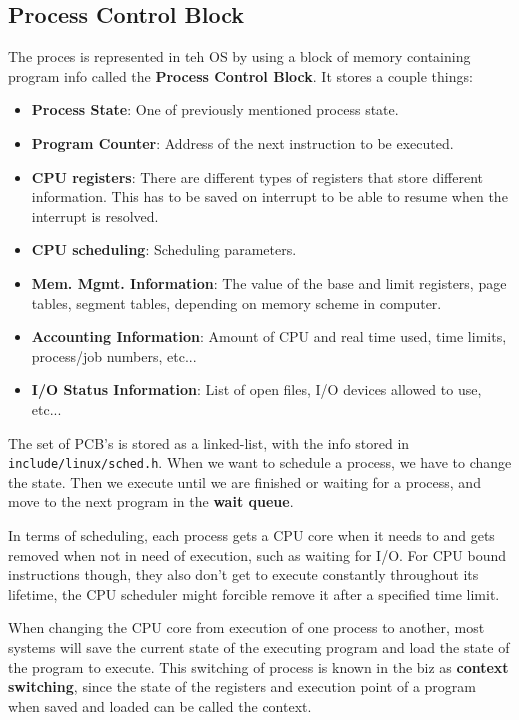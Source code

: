 \documentclass{tufte-handout}
\begin{document}
\subsection{Process Control Block}
The proces is represented in teh OS by using a block of memory containing program info called
the \textbf{Process Control Block}. It stores a couple things:
\begin{itemize}
	\item \textbf{Process State}: One of previously mentioned process state.
	\item \textbf{Program Counter}: Address of the next instruction to be executed.
	\item \textbf{CPU registers}: There are different types of registers that store different
				information. This has to be saved on interrupt to be able to resume when the 
				interrupt is resolved.
	\item \textbf{CPU scheduling}: Scheduling parameters.
	\item \textbf{Mem. Mgmt. Information}: The value of the base and limit registers, page tables, 
				segment tables, depending on memory scheme in computer.
	\item \textbf{Accounting Information}: Amount of CPU and real time used, time limits, 
				process/job numbers, etc...
	\item \textbf{I/O Status Information}: List of open files, I/O devices allowed to use, etc...
\end{itemize}

The set of PCB's is stored as a linked-list, with the info stored in \texttt{include/linux/sched.h}.
When we want to schedule a process, we have to change the state. Then we execute until we are
finished or waiting for a process, and move to the next program in the \textbf{wait queue}.

In terms of scheduling, each process gets a CPU core when it needs to and gets removed when 
not in need of execution, such as waiting for I/O. For CPU bound instructions though, they also 
don't get to execute constantly throughout its lifetime, the CPU scheduler might forcible remove
it after a specified time limit. 

When changing the CPU core from execution of one process to another, most systems will save the 
current state of the executing program and load the state of the program to execute. This 
switching of process is known in the biz as \textbf{context switching}, since the state of the 
registers and execution point of a program when saved and loaded can be called the context.
\end{document}
